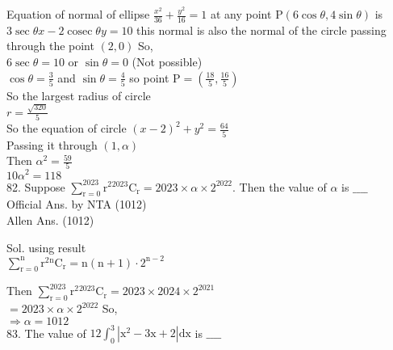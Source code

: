 \documentclass[10pt]{article}
\begin{document}
Equation of normal of ellipse \(\frac{x^{2}}{36}+\frac{y^{2}}{16}=1\) at any point \(\mathrm{P}(6 \cos \theta, 4 \sin \theta)\) is\\
\(3 \sec \theta x-2 \operatorname{cosec} \theta y=10\) this normal is also the normal of the circle passing through the point \((2,0)\) So,\\
\(6 \sec \theta=10\) or \(\sin \theta=0\) (Not possible)\\
\(\cos \theta=\frac{3}{5}\) and \(\sin \theta=\frac{4}{5}\) so point \(\mathrm{P}=\left(\frac{18}{5}, \frac{16}{5}\right)\)\\
So the largest radius of circle\\
\(r=\frac{\sqrt{320}}{5}\)\\
So the equation of circle \((x-2)^{2}+y^{2}=\frac{64}{5}\)\\
Passing it through \((1, \alpha)\)\\
Then \(\alpha^{2}=\frac{59}{5}\)\\
\(10 \alpha^{2}=118\)\\
82. Suppose \(\sum_{\mathrm{r}=0}^{2023} \mathrm{r}^{2}{ }^{2023} \mathrm{C}_{\mathrm{r}}=2023 \times \alpha \times 2^{2022}\). Then the value of \(\alpha\) is \(\_\_\_\_\)\\
Official Ans. by NTA (1012)\\
Allen Ans. (1012)

Sol. using result\\
\(\sum_{\mathrm{r}=0}^{\mathrm{n}} \mathrm{r}^{2}{ }^{\mathrm{n}} \mathrm{C}_{\mathrm{r}}=\mathrm{n}(\mathrm{n}+1) \cdot 2^{\mathrm{n}-2}\)

Then \(\sum_{\mathrm{r}=0}^{2023} \mathrm{r}^{2}{ }^{2023} \mathrm{C}_{\mathrm{r}}=2023 \times 2024 \times 2^{2021}\)\\
\(=2023 \times \alpha \times 2^{2022}\) So,\\
\(\Rightarrow \alpha=1012\)\\
83. The value of \(12 \int_{0}^{3}\left|\mathrm{x}^{2}-3 \mathrm{x}+2\right| \mathrm{dx}\) is \(\_\_\_\_\)
\end{document}
